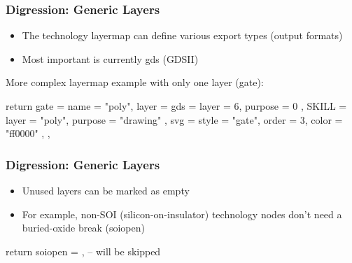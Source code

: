 \documentclass[aspectratio=169, dvipsnames, x11names, svgnames, 11pt]{beamer}
\begin{document}
\begin{frame}[fragile]
    \centering
    \frametitle{Digression: Generic Layers}
    \begin{itemize}
        \item The technology layermap can define various export types (output formats)
        \item Most important is currently gds (GDSII)
    \end{itemize}
    \vfill
    More complex layermap example with only one layer (gate):
    \begin{luacode}
        return {
            gate = {
                name = "poly",
                layer = {
                    gds = { layer = 6, purpose = 0 },
                    SKILL = { layer = "poly", purpose = "drawing" },
                    svg = { style = "gate", order = 3, color = "ff0000" },
                }
            },
        }
    \end{luacode}
\end{frame}

\begin{frame}[fragile]
    \centering
    \frametitle{Digression: Generic Layers}
    \begin{itemize}
        \item Unused layers can be marked as empty
        \item For example, non-SOI (silicon-on-insulator) technology nodes don't need a buried-oxide break (soiopen)
    \end{itemize}
    \vfill
    \begin{luacode}
        return {
            soiopen = {}, -- will be skipped
        }
    \end{luacode}
\end{frame}
\end{document}
